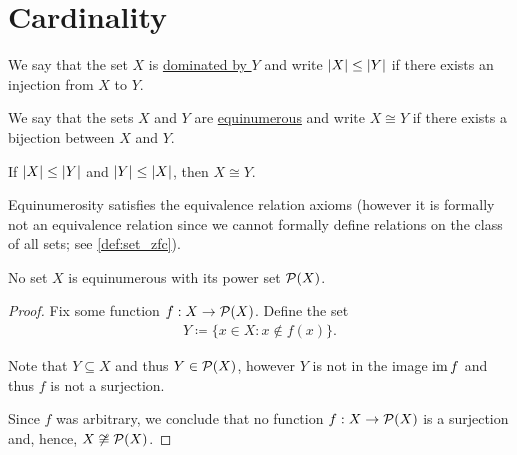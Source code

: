 \section{Cardinality}\label{sec:cardinality}

\begin{definition}\label{def:set_domination}\cite[145]{Enderton1977}
  We say that the set $X$ is \ul{dominated by $Y$} and write $\left\vert X \right\vert \leq \left\vert Y \right\vert$ if there exists an injection from $X$ to $Y$.
\end{definition}

\begin{definition}\label{def:equinumerous_sets}\cite[129]{Enderton1977}
  We say that the sets $X$ and $Y$ are \ul{equinumerous} and write $X \cong Y$ if there exists a bijection between $X$ and $Y$.
\end{definition}

\begin{theorem}\label{thm:cantor_schroder_bernstein}\cite[147]{Enderton1977}
  If $\left\vert X \right\vert \leq \left\vert Y \right\vert$ and $\left\vert Y \right\vert \leq \left\vert X \right\vert$, then $X \cong Y$.
\end{theorem}

\begin{proposition}\label{thm:equinumerousity_equivalence}\cite[theorem 6A]{Enderton1977}
  Equinumerosity satisfies the equivalence relation axioms (however it is formally not an equivalence relation since we cannot formally define relations on the class of all sets; see \cref{def:set_zfc}).
\end{proposition}

\begin{theorem}[Cantor]\label{thm:cantor_power_set_theorem}\cite[theorem 6B]{Enderton1977}
  No set $X$ is equinumerous with its power set $\operatorname{\mathcal P}(X)$.
\end{theorem}
\begin{proof}
  Fix some function $f: X \to \operatorname{\mathcal P}(X)$. Define the set
  \begin{align*}
    Y \coloneqq \{ x \in X \colon x \not\in f(x) \}.
  \end{align*}

  Note that $Y \subseteq X$ and thus $Y \in \operatorname{\mathcal P}(X)$, however $Y$ is not in the image $\operatorname{im} f$ and thus $f$ is not a surjection.

  Since $f$ was arbitrary, we conclude that no function $f: X \to \operatorname{\mathcal P}(X)$ is a surjection and, hence, $X \not\cong \operatorname{\mathcal P}(X)$.
\end{proof}

